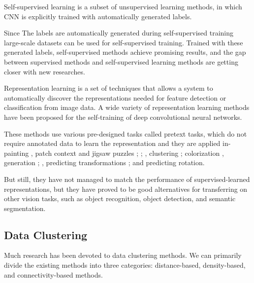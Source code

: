 Self-supervised learning is a subset of unsupervised learning methods, in which CNN is explicitly trained with automatically generated labels. 

\medskip

Since The labels are automatically generated during self-supervised training large-scale datasets can be used for self-supervised training. Trained with these generated labels, self-supervised methods achieve promising results, and the gap between supervised methods and self-supervised learning methods are getting closer with new researches.\cite{jing2020self}

\medskip

Representation learning is a set of techniques that allows a system to automatically discover the representations needed for feature detection or classification from image data.
A wide variety of representation learning methods have been proposed for the self-training of deep convolutional neural networks. 



These methods use various pre-designed tasks called pretext tasks, which do not require annotated data to learn the representation and they are applied in-painting \cite{pathak2016context}, patch context and jigsaw puzzles \cite{doersch2016unsupervised}; \cite{noroozi2017unsupervised}; \cite{noroozi2018boosting}, clustering \cite{caron2019deep}; \cite{zhuang2019selfsupervised} colorization \cite{zhang2016colorful},
generation \cite{jenni2018selfsupervised}; \cite{donahue2019large}, predicting transformations \cite{gidaris2018unsupervised}; \cite{zhang2019aet} and  predicting rotation\cite{gidaris2018unsupervised}.

\bigskip

But still, they have not managed to match the performance of supervised-learned representations, but they have proved to be good alternatives for transferring on other vision tasks, such as object recognition, object detection, and semantic segmentation. 





\subsection{Data Clustering} 

Much research has been devoted to data clustering methods. We can primarily divide the existing methods into three categories: distance-based, density-based, and connectivity-based methods.  \cite{madhulatha2012overview}

